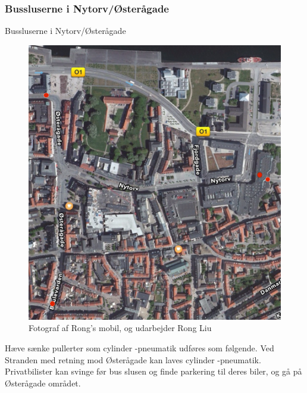 \subsubsection{Bussluserne i Nytorv/Østerågade}
\label{subs:buslusnytorv}
{Bussluserne i Nytorv/Østerågade}
\label{sub:}
\begin{figure}[htbp]
  \centering
  \begin{adjustbox}{max width=\textwidth}
    \includegraphics{figures/Billederogfigur/2.jpg}
 \end{adjustbox}
  \caption{ Fotograf af Rong’s mobil, og udarbejder Rong Liu}
   \label{fig: Fotograf af Rong}
\end{figure}
Hæve sænke pullerter som cylinder -pneumatik udføres som følgende. Ved Stranden med retning mod Østerågade kan laves cylinder -pneumatik. Privatbilister kan svinge før bus slusen og finde parkering til deres biler, og gå på Østerågade området.
